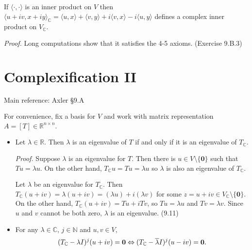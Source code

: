 \documentclass[11pt]{article}
\newcommand{\1}{\mathbf{1}}
\newcommand{\inner}[2]{\langle #1, #2 \rangle}
\newcommand{\0}{\mathbf{0}}
\newcommand{\C}{\mathbb{C}}
\newcommand{\F}{\mathbb{F}}
\newcommand{\cL}{\mathcal{L}}
\newcommand{\R}{\mathbb{R}}
\renewcommand{\geq}{\geqslant}
\newcommand{\spitem}{\item[$\circ$]}
\begin{document}
{\begin{itemize}
If $ \inner{\cdot}{\cdot} $ is an inner product on $V$ then
$ \inner{u+iv}{x+iy}_\C = \inner ux + \inner vy + i \inner vx -i \inner uy $
defines a complex inner product on $ V_\C $.

\emph{Proof.}
Long computations show that it satisfies the 4-5 axioms.
\hfill
(Exercise 9.B.3)

\end{itemize}




\clearpage
\section{Complexification II}

Main reference:
Axler \S9.A

For convenience, fix a basis for $V$ and work with matrix representation $A=[T]\in \R^{n \times n}$.


\begin{itemize}

\item

Let $\lambda\in\mathbb{R}$.
Then $\lambda$ is an eigenvalue of $T$ if and only if it is an eigenvalue of $T_{\mathbb{C}}$.

\emph{Proof.}
Suppose $\lambda$ is an eigenvalue for $T$.
Then there is $u \in V \setminus \{\0\}$ such that $T u = \lambda u$.
On the other hand, $T_\C u = T u = \lambda u$ so $\lambda$ is also an eigenvalue of $T_\C$.

Let $\lambda$ be an eigenvalue for $T_\C$.
Then $T_\C(u+iv) = \lambda (u+iv) = (\lambda u) + i (\lambda v)$ for some $z=u+iv \in V_\C \setminus \{\0\}$.
On the other hand, $T_\C(u+iv) = Tu + i Tv$, so $Tu = \lambda u$ and $T v = \lambda v$.
Since $u$ and $v$ cannot be both zero, $\lambda$ is an eigenvalue.
\hfill
(9.11)

\spitem

For any $\lambda\in\mathbb{C}$, $j\in\mathbb{N}$ and $u,v\in V$,
\[
(T_{\mathbb{C}}-\lambda I)^j(u+iv)={\bf 0}\Leftrightarrow (T_{\mathbb{C}}-\overline{\lambda} I)^j(u-iv)={\bf 0}.
\]


\end{itemize}}
\end{document}

